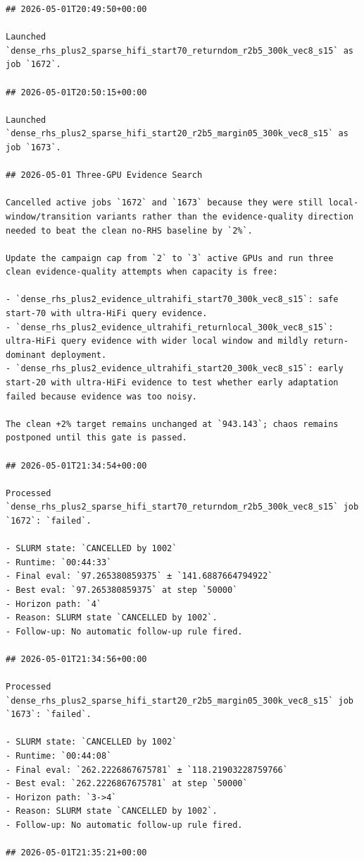 \begin{verbatim}
## 2026-05-01T20:49:50+00:00

Launched `dense_rhs_plus2_sparse_hifi_start70_returndom_r2b5_300k_vec8_s15` as job `1672`.

## 2026-05-01T20:50:15+00:00

Launched `dense_rhs_plus2_sparse_hifi_start20_r2b5_margin05_300k_vec8_s15` as job `1673`.

## 2026-05-01 Three-GPU Evidence Search

Cancelled active jobs `1672` and `1673` because they were still local-window/transition variants rather than the evidence-quality direction needed to beat the clean no-RHS baseline by `2%`.

Update the campaign cap from `2` to `3` active GPUs and run three clean evidence-quality attempts when capacity is free:

- `dense_rhs_plus2_evidence_ultrahifi_start70_300k_vec8_s15`: safe start-70 with ultra-HiFi query evidence.
- `dense_rhs_plus2_evidence_ultrahifi_returnlocal_300k_vec8_s15`: ultra-HiFi query evidence with wider local window and mildly return-dominant deployment.
- `dense_rhs_plus2_evidence_ultrahifi_start20_300k_vec8_s15`: early start-20 with ultra-HiFi evidence to test whether early adaptation failed because evidence was too noisy.

The clean +2% target remains unchanged at `943.143`; chaos remains postponed until this gate is passed.

## 2026-05-01T21:34:54+00:00

Processed `dense_rhs_plus2_sparse_hifi_start70_returndom_r2b5_300k_vec8_s15` job `1672`: `failed`.

- SLURM state: `CANCELLED by 1002`
- Runtime: `00:44:33`
- Final eval: `97.265380859375` ± `141.6887664794922`
- Best eval: `97.265380859375` at step `50000`
- Horizon path: `4`
- Reason: SLURM state `CANCELLED by 1002`.
- Follow-up: No automatic follow-up rule fired.

## 2026-05-01T21:34:56+00:00

Processed `dense_rhs_plus2_sparse_hifi_start20_r2b5_margin05_300k_vec8_s15` job `1673`: `failed`.

- SLURM state: `CANCELLED by 1002`
- Runtime: `00:44:08`
- Final eval: `262.2226867675781` ± `118.21903228759766`
- Best eval: `262.2226867675781` at step `50000`
- Horizon path: `3->4`
- Reason: SLURM state `CANCELLED by 1002`.
- Follow-up: No automatic follow-up rule fired.

## 2026-05-01T21:35:21+00:00


\end{verbatim}
